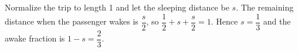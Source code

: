 Normalize the trip to length 1 and let the sleeping distance be $s$. The remaining distance when the passenger wakes is $\dfrac{s}{2}$, so $\dfrac{1}{2}+s+\dfrac{s}{2}=1$. Hence $s=\dfrac{1}{3}$ and the awake fraction is $1-s=\boxed{\dfrac{2}{3}}$.
